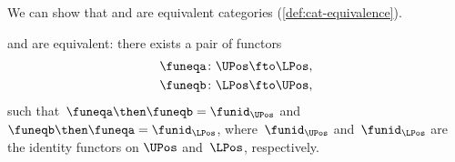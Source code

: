 

We can show that \UPos and \LPos are equivalent categories (\cref{def:cat-equivalence}).

\begin{lemma}
\label{lem:ulposequiv}
\UPos and \LPos are equivalent: there exists a pair of functors
\begin{equation}
    \begin{aligned}
    \funeqa\colon \UPos&\fto \LPos,\\
    \funeqb\colon \LPos&\fto \UPos,
    \end{aligned}
\end{equation}
such that~$\funeqa \then \funeqb=\funid_{\UPos}$ and~$\funeqb \then \funeqa=\funid_{\LPos}$, where~$\funid_{\UPos}$ and~$\funid_{\LPos}$ are the identity functors on $\UPos$ and~$\LPos$, respectively.
\end{lemma}

